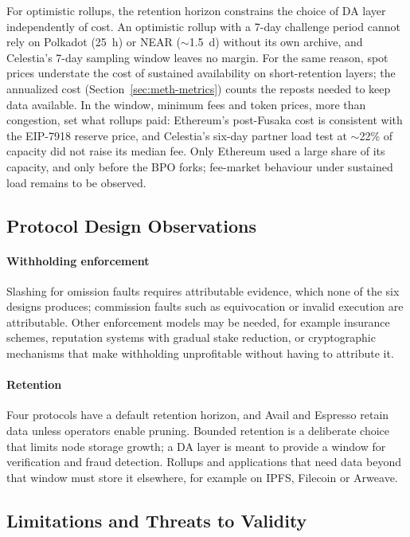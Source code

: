 For optimistic rollups, the retention horizon constrains the choice of DA layer independently of cost.
An optimistic rollup with a 7-day challenge period cannot rely on Polkadot (25~h) or NEAR ($\sim$1.5~d) without its own archive, and Celestia's 7-day sampling window leaves no margin.
For the same reason, spot prices understate the cost of sustained availability on short-retention layers; the annualized cost (Section~\ref{sec:meth-metrics}) counts the reposts needed to keep data available.
In the window, minimum fees and token prices, more than congestion, set what rollups paid: Ethereum's post-Fusaka cost is consistent with the EIP-7918 reserve price, and Celestia's six-day partner load test at $\sim$22\% of capacity did not raise its median fee.
Only Ethereum used a large share of its capacity, and only before the BPO forks; fee-market behaviour under sustained load remains to be observed.

\subsection{Protocol Design Observations}
\label{sec:disc-design}

\paragraph{Withholding enforcement}
Slashing for omission faults requires attributable evidence, which none of the six designs produces; commission faults such as equivocation or invalid execution are attributable.
Other enforcement models may be needed, for example insurance schemes, reputation systems with gradual stake reduction, or cryptographic mechanisms that make withholding unprofitable without having to attribute it.

\paragraph{Retention}
Four protocols have a default retention horizon, and Avail and Espresso retain data unless operators enable pruning.
Bounded retention is a deliberate choice that limits node storage growth; a DA layer is meant to provide a window for verification and fraud detection.
Rollups and applications that need data beyond that window must store it elsewhere, for example on IPFS, Filecoin or Arweave.

\subsection{Limitations and Threats to Validity}
\label{sec:disc-limitations}

